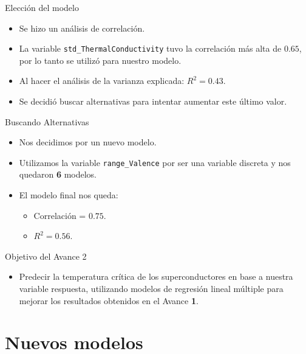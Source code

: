 \documentclass[11pt]{beamer}
\newcommand{\cod}[1]{\texttt{\frenchspacing#1}}
\begin{document}
\begin{frame}{Elección del modelo}
	\begin{itemize}
		\item Se hizo un análisis de correlación.
		\pause
		\item La variable \cod{std\_ThermalConductivity} tuvo la correlación más alta de $\mathbf{0.65}$, por lo tanto se utilizó para nuestro modelo.
		\pause
		\item Al hacer el análisis de la varianza explicada: $R^2=\mathbf{0.43}$.
		\pause
		\item Se decidió buscar alternativas para intentar aumentar este último valor.
	\end{itemize}
\end{frame}

\begin{frame}{Buscando Alternativas}
	\begin{itemize}
		\item  Nos decidimos por un nuevo modelo.
		\pause
		\item  Utilizamos la variable \cod{range\_Valence} por ser una variable discreta y nos quedaron \textbf{6} modelos.
		\pause
		\item  El modelo final nos queda:
		\begin{itemize}
			\pause
			\item  Correlación = $\mathbf{0.75}$.
			\pause
			\item  $R^2 = \mathbf{0.56}$.
		\end{itemize}
	\end{itemize}
\end{frame}

\begin{frame}{Objetivo del Avance 2}
	\begin{itemize}
		\item Predecir la temperatura crítica de los superconductores en base a nuestra variable respuesta, utilizando modelos de regresión lineal múltiple para mejorar los resultados obtenidos en el Avance \textbf{1}.
	\end{itemize}
\end{frame}


\section{Nuevos modelos}
\end{document}
